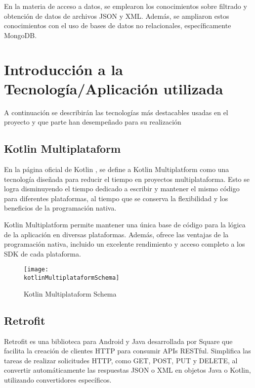 \documentclass[12pt,twoside,titlepage]{report}
\newcommand{\kotlinMultiplataformSchema}{images/kotlin-multiplatform-structure.png}
\begin{document}
En la materia de acceso a datos, se emplearon los conocimientos sobre filtrado y obtención de datos de archivos JSON y XML. Además, se ampliaron estos conocimientos con el uso de bases de datos no relacionales, específicamente MongoDB.

\section{Introducción a la Tecnología/Aplicación utilizada}

A continuación se describirán las tecnologías más destacables usadas en el proyecto y que parte han desempeñado para su realización 

\subsection{Kotlin Multiplataform}
\label{sec:Kotlin-Multiplataform}

En la página oficial de Kotlin \cite{kotlin-multiplataform}, se define a Kotlin Multiplatform como una tecnología diseñada para reducir el tiempo en proyectos multiplataforma. Esto se logra disminuyendo el tiempo dedicado a escribir y mantener el mismo código para diferentes plataformas, al tiempo que se conserva la flexibilidad y los beneficios de la programación nativa.

Kotlin Multiplatform permite mantener una única base de código para la lógica de la aplicación en diversas plataformas. Además, ofrece las ventajas de la programación nativa, incluido un excelente rendimiento y acceso completo a los SDK de cada plataforma.

\begin{figure}[H]
    \centering
    \texttt{[image: \\kotlinMultiplataformSchema]}
    \caption{Kotlin Multiplataform Schema}
    \label{fig:kotlinMultiplataformSchema}
\end{figure}

\subsection{Retrofit}
\label{sec:Retrofit}

Retrofit \cite{retrofit} es una biblioteca para Android y Java desarrollada por Square que facilita la creación de clientes HTTP para consumir APIs RESTful. Simplifica las tareas de realizar solicitudes HTTP, como GET, POST, PUT y DELETE, al convertir automáticamente las respuestas JSON o XML en objetos Java o Kotlin, utilizando convertidores específicos. 
\end{document}
